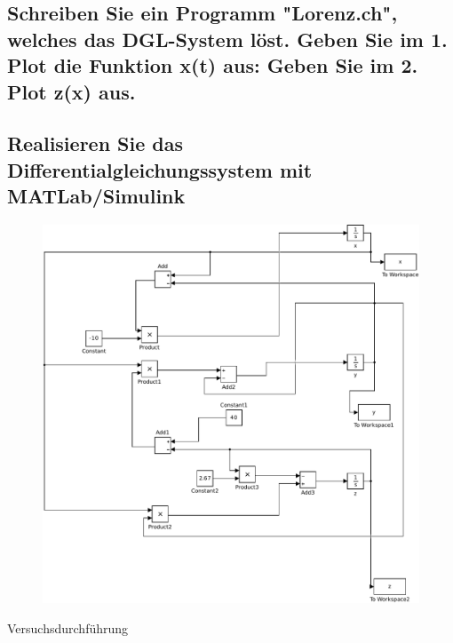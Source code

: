 \documentclass[10pt,a4paper]{article}
\begin{document}
\subsection{Schreiben Sie ein Programm "Lorenz.ch", welches das DGL-System löst.
Geben Sie im 1. Plot die Funktion x(t) aus:
Geben Sie im 2. Plot z(x) aus.}

\subsection{Realisieren Sie das Differentialgleichungssystem mit MATLab/Simulink}
\begin{figure}[h]
\centering
\includegraphics[width=0.9\linewidth]{../screenshots/3}
\end{figure}

\begin{center}
\begin{large}
Versuchsdurchführung
\end{large}
\end{center}
\end{document}
